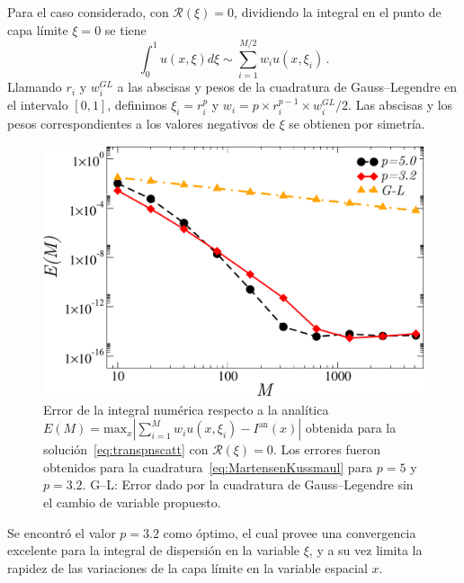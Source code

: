 Para el caso considerado, con $\mathcal{R}(\xi)=0$, 
dividiendo la integral en el punto de capa límite $\xi=0$ se tiene 
\begin{equation}
\int_{0}^{1} u(x,\xi) d\xi \sim \sum_{i=1}^{M/2} w_i u(x,\xi_i) \, .
\label{eq:MartensenKussmaul}
\end{equation}
Llamando $r_i$ y $w_i^{GL}$ a las abscisas y pesos de la 
cuadratura de Gauss--Legendre en el intervalo $[0,1]$, 
definimos $\xi_i=r_i^p$ y $w_i= p \times r_i^{p-1} \times w_i^{GL}/2$. 
Las abscisas y los pesos correspondientes a los valores negativos 
de $\xi$ se obtienen por simetría. 
\begin{figure}[h!]
\centering
  \includegraphics[width=0.5\linewidth]{figuras/quads.pdf}
  \caption{Error de la integral numérica respecto a la 
  analítica $E(M)=\text{max}_x |\sum_{i=1}^M w_i u(x,\xi_i)-I^{\text{an}}(x)|$
  obtenida para la solución~\eqref{eq:transpnscatt} con $\mathcal{R}(\xi)=0$. 
  Los errores fueron obtenidos para la cuadratura~\eqref{eq:MartensenKussmaul} 
  para $p=5$ y $p=3.2$. G--L: 
  Error dado por la cuadratura de Gauss--Legendre sin el cambio de variable propuesto.}
 \label{fig:intconvs}
\end{figure}
Se encontró el valor $p=3.2$ como óptimo, el cual 
provee una convergencia excelente para la integral 
de dispersión en la variable $\xi$, y a su vez limita la rapidez 
de las variaciones de la capa límite en la variable espacial $x$. 

